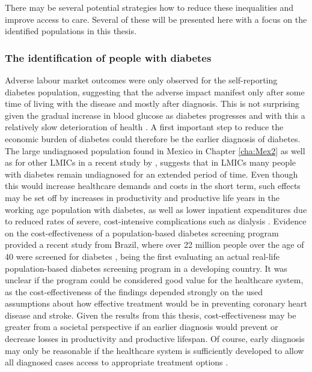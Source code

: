 There may be several potential strategies how to reduce these inequalities and improve access to care. Several of these will be presented here with a focus on the identified populations in this thesis.

\subsubsection*{The identification of people with diabetes}

Adverse labour market outcomes were only observed for the self-reporting diabetes population, suggesting that the adverse impact manifest only after some time of living with the disease and mostly after diagnosis. This is not surprising given the gradual increase in blood glucose as diabetes progresses and with this a relatively slow deterioration of health \parencite{Bertram2010}. A first important step to reduce the economic burden of diabetes could therefore be the earlier diagnosis of diabetes. The large undiagnosed population found in Mexico in Chapter \ref{cha:Mex2} as well as for other \acp{LMIC} in a recent study by \textcite{Beagley2014}, suggests that in \acp{LMIC} many people with diabetes remain undiagnosed for an extended period of time. Even though this would increase healthcare demands and costs in the short term, such effects may be set off by increases in productivity and productive life years in the working age population with diabetes, as well as lower inpatient expenditures due to reduced rates of severe, cost-intensive complications such as dialysis  \parencite{Engelgau2012}. Evidence on the cost-effectiveness of a population-based diabetes screening program provided a recent study from Brazil, where over 22 million people over the age of 40 were screened for diabetes \parencite{Toscano2015}, being the first evaluating an actual real-life population-based diabetes screening program in a developing country. It was unclear if the program could be considered good value for the healthcare system, as the cost-effectiveness of the findings depended strongly on the used assumptions about how effective treatment would be in preventing coronary heart disease and stroke. Given the results from this thesis, cost-effectiveness may be greater from a societal perspective if an earlier diagnosis would prevent or decrease losses in productivity and productive lifespan. Of course, early diagnosis may only be reasonable if the healthcare system is sufficiently developed to allow all diagnosed cases access to appropriate treatment options \parencite{Toscano2015,Engelgau2012}. 

